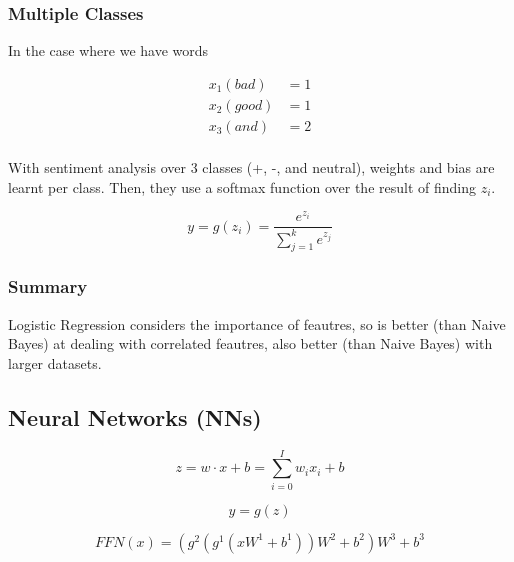 \documentclass[11pt]{article}
\begin{document}
\subsubsection{Multiple Classes}

In the case where we have words

\begin{align*}
    x_1 (bad) & = 1 \\
    x_2 (good) & = 1 \\
    x_3 (and) & = 2 \\
\end{align*}

With sentiment analysis over 3 classes (+, -, and neutral), weights and bias are learnt per class. Then, they use a softmax function over the result of finding $z_i$.

\begin{equation*}
    y=g(z_i)=\frac{e^{z_i}}{\sum^k_{j=1}e^{z_j}}
\end{equation*}

\subsubsection{Summary}

Logistic Regression considers the importance of feautres, so is better (than Naive Bayes) at dealing with correlated feautres, also better (than Naive Bayes) with larger datasets.

\subsection{Neural Networks (NNs)}

\begin{definition}
    \begin{equation*}
        z = w \cdot x + b = \sum^I_{i=0}w_ix_i + b
    \end{equation*}
\end{definition}

\begin{definition}
    \begin{equation*}
        y = g(z)
    \end{equation*}
\end{definition}

\begin{definition}
    \begin{equation*}
        FFN(x) = (g^2(g^1(xW^1+b^1))W^2 + b^2)W^3 + b^3
    \end{equation*}
\end{definition}
\end{document}
